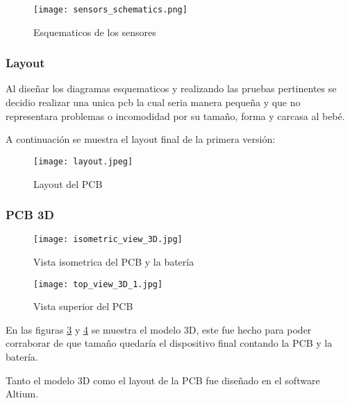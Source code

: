         \begin{figure}[htp!]
            \centering
            \texttt{[image: sensors\_schematics.png]}
            \caption{Esquematicos de los sensores}
            \label{fig: sensors_schematics}
        \end{figure}
        \FloatBarrier

        

    \subsubsection{Layout}
        Al diseñar los diagramas esquematicos y realizando las pruebas pertinentes se decidio realizar 
        una unica pcb la cual seria manera pequeña y que no representara problemas o incomodidad por su 
        tamaño, forma y carcasa al bebé.

        A continuación se muestra el layout final de la primera versión:

        \begin{figure}[htp!]
            \centering
            \texttt{[image: layout.jpeg]}
            \caption{Layout del PCB}
            \label{fig: layout}
        \end{figure}
        \FloatBarrier

    \subsubsection{PCB 3D}
        \begin{figure}[htp!]
            \centering
            \texttt{[image: isometric\_view\_3D.jpg]}
            \caption{Vista isometrica del PCB y la batería}
            \label{fig: isometric_3d}
        \end{figure}
        \FloatBarrier
        \begin{figure}[htp!]
            \centering
            \texttt{[image: top\_view\_3D\_1.jpg]}
            \caption{Vista superior del PCB}
            \label{fig: top_3d}
        \end{figure}
        \FloatBarrier

        En las figuras \ref{fig: isometric_3d} y \ref{fig: top_3d} se muestra el modelo 3D, este fue hecho
        para poder corraborar de que tamaño quedaría el dispositivo final contando la PCB y la batería.

        Tanto el modelo 3D como el layout de la PCB fue diseñado en el software Altium.
